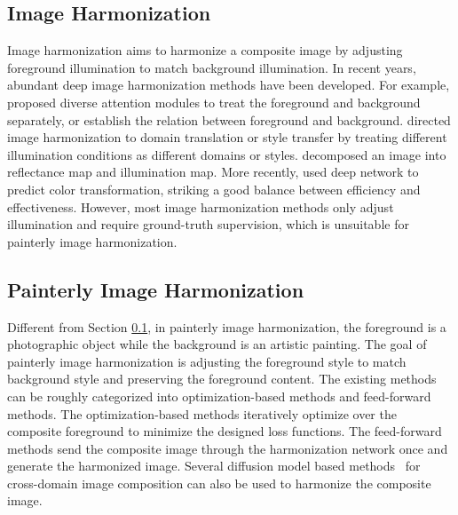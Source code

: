 \documentclass[letterpaper]{article} %
\begin{document}
\subsection{Image Harmonization} \label{sec:image_harmonization}

Image harmonization aims to harmonize a composite image by adjusting foreground illumination to match background illumination. 
In recent years, abundant deep image harmonization methods \cite{tsai2017deep,Jiang_2021_ICCV,xing2022composite,peng2022frih,zhu2022image,valanarasu2022interactive,LEMaRT} have been developed. For example, \cite{xiaodong2019improving,Hao2020bmcv,sofiiuk2021foreground} proposed diverse attention modules to treat the foreground and background separately, or establish the relation between foreground and background. \cite{cong2020dovenet,ling2021region,hang2022scs} directed image harmonization to domain translation or style transfer by treating different illumination conditions as different domains or styles.  \cite{guo2021image,guo2021intrinsic,guo2022transformer}  decomposed an image into reflectance map and illumination map.  More recently, \cite{cong2022high,ke2022harmonizer,liang2021spatial,xue2022dccf,PCTNet,WangCVPR2023} used deep network to predict color transformation, striking a good balance between efficiency and effectiveness. 
However, most image harmonization methods only adjust illumination and require ground-truth supervision, which is unsuitable for painterly image harmonization.
\subsection{Painterly Image Harmonization}

Different from Section \ref{sec:image_harmonization}, in painterly image harmonization, the foreground is a photographic object while the background is an artistic painting. The goal of painterly image harmonization is adjusting the foreground style to match background style and preserving the foreground content. The existing methods can be roughly categorized into optimization-based methods and feed-forward methods.  The optimization-based methods \cite{luan2018deep,zhang2020deep} iteratively optimize over the composite foreground to minimize the designed loss functions. The feed-forward methods \cite{peng2019element,yan2022style,cao2022painterly} send the composite image through the harmonization network once and generate the harmonized image. 
Several diffusion model based methods~\cite{sdedit,cdc} for cross-domain image composition can also be used to harmonize the composite image. 
\end{document}
